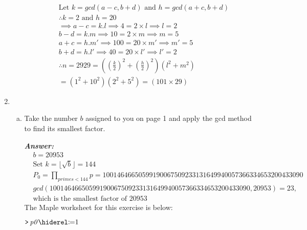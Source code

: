 \documentclass[11pt,a4paper,fleqn]{article}
\newcommand{\qed}{\tag*{$\blacksquare$}}
\begin{document}
\begin{enumerate}[1.]
\begin{enumerate}[a.]
\begin{flushleft}
\begin{align*}
               \end{align*}
               \begin{align*}
                    &\text{Let } k = gcd(a - c, b + d) \text{ and } h = gcd(a + c, b + d)\\
                    &\therefore k = 2 \text{ and } h = 20\\
                    &\implies a - c =  k.l \implies 4 = 2 \times l \implies l = 2\\
                    &b - d = k.m \implies 10 = 2 \times m \implies m = 5\\
                    &a + c = h.m' \implies 100 = 20 \times m' \implies m' = 5\\
                    &b + d = h.l' \implies 40 = 20 \times l' \implies l' = 2\\
                    &\therefore n = 2929 = ((\frac{k}{2})^2 + (\frac{h}{2})^2)(l^2 + m^2)\\
                    & = (1^2 + 10^2)(2^2 + 5^2) = (101 \times 29)
                    \qed
                \end{align*}
			\end{flushleft}
		\end{enumerate}
		\item
		\begin{enumerate}[(a)]
			\item Take the number $b$ assigned to you on page 1 and apply the gcd method to find its smallest factor.
			\begin{flushleft}
				\textbf{\textit{Answer:}}
                \begin{align*}
                    & b = 20953\\
                    &\text{Set } k = \lfloor\sqrt{b}\rfloor = 144\\
                    &P_0 = \prod_{primes < 144}^{}p = 10014646650599190067509233131649940057366334653200433090\\
                    &gcd(10014646650599190067509233131649940057366334653200433090, 20953) = 23, \\
                    &\text{which is the smallest factor of 20953}
                    \qed
                \end{align*}
                \bigbreak
                The Maple worksheet for this exercise is below:
                \begin{mdframed}
                    \mapleinput
                    {$ \displaystyle \texttt{>\,} \mathit{p0} \coloneqq 1 $}


\end{mdframed}
\end{flushleft}
\end{enumerate}
\end{enumerate}
\end{document}
